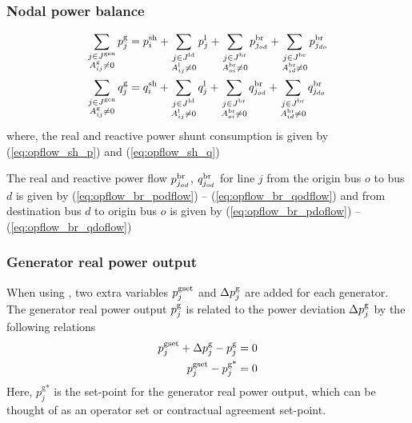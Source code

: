 \subsubsection{Nodal power balance}
\begin{align}
\sum_{\substack{j \in J^\text{gen} \\ A^{\text{g}}_{ij} \neq 0}} p^\text{g}_j &=   p^{\text{sh}}_i + \sum_{\substack{j \in J^\text{ld} \\ A^{\text{l}}_{ij} \neq 0}} p^{\text{l}}_j + \sum_{\substack{j \in J^\text{br} \\ A^{\text{br}}_{oi} \neq 0}} p^\text{br}_{j_{od}} + \sum_{\substack{j \in J^\text{br} \\ A^{\text{br}}_{id} \neq 0}} p^\text{br}_{j_{do}} \\
\sum_{\substack{j \in J^\text{gen} \\ A^{\text{g}}_{ij} \neq 0}} q^\text{g}_j &=  q^{\text{sh}}_i + \sum_{\substack{j \in J^\text{ld} \\ A^{\text{l}}_{ij} \neq 0}} q^{\text{l}}_j +
\sum_{\substack{j \in J^\text{br} \\ A^{\text{br}}_{oi} \neq 0}} q^\text{br}_{j_{od}} + \sum_{\substack{j \in J^\text{br} \\ A^{\text{br}}_{id} \neq 0}} q^\text{br}_{j_{do}} \\
\end{align}
where, the real and reactive power shunt consumption is given by (\ref{eq:opflow_sh_p}) and (\ref{eq:opflow_sh_q})


The real and reactive power flow $p^\text{br}_{j_{od}}$, $q^\text{br}_{j_{od}}$ for line $j$ from the origin bus $o$ to bus $d$ is given by (\ref{eq:opflow_br_podflow}) -- 
 (\ref{eq:opflow_br_qodflow})
and from destination bus $d$ to origin bus $o$ is given by (\ref{eq:opflow_br_pdoflow}) -- 
 (\ref{eq:opflow_br_qdoflow})

\subsubsection{Generator real power output}

When using \option{\opflowgensetpoint}, two extra variables $p^{\text{gset}}_j$ and $\Delta{p}^\text{g}_j$ are added for each generator. The generator real power output $p^\text{g}_j$ is related to the power deviation $\Delta{p}^\text{g}_j$ by the following relations
\begin{align}
  p^{\text{gset}}_j + \Delta{p}^\text{g}_j - p^\text{g}_j = 0 \\
  p^{\text{gset}}_j - p^{\text{g*}}_j = 0
\end{align}
Here, $p^{\text{g*}}_j$ is the set-point for the generator real power output, which can be thought of as an operator set or contractual agreement set-point.

